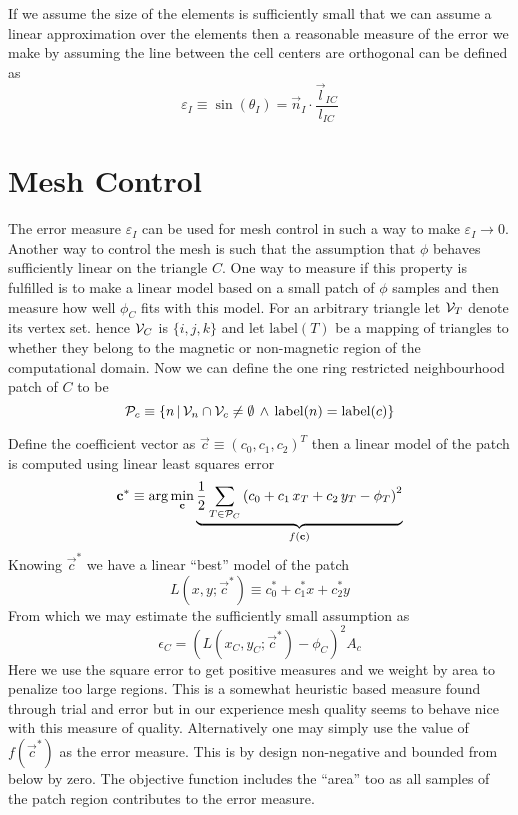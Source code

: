 \documentclass[preprint,nocopyrightspace]{sigplanconf}
\begin{document}
If we assume the size of the elements is sufficiently small that we
can assume a linear approximation over the elements then a reasonable
measure of the error we make by assuming the line between the cell
centers are orthogonal can be defined as
\begin{equation}
  \varepsilon_I 
  \equiv 
  \sin
  \left( 
    \theta_I 
  \right) 
  =
  \vec n_I 
  \cdot
  \frac{
    \vec l_{IC}
  }{
    l_{IC}
  }
\end{equation}

\section{Mesh Control}\label{sec:mesh-control}
The error measure $\varepsilon_I$ can be used for mesh control in such
a way to make $\varepsilon_I \rightarrow 0$. Another way to control
the mesh is such that the assumption that $\phi$ behaves sufficiently
linear on the triangle $C$. One way to measure if this property is
fulfilled is to make a linear model based on a small patch of $\phi$
samples and then measure how well $\phi_C$ fits with this model. For
an arbitrary triangle let $\mathcal{V}_T$ denote its vertex set. hence
$\mathcal{V}_C$ is $\{i, j, k\}$ and let $\text{label}\left(T\right)$ be a
mapping of triangles to whether they belong to the magnetic or
non-magnetic region of the computational domain. Now we can define the
one ring restricted neighbourhood patch of $C$ to be
\begin{equation}
  \mathcal{P}_c 
  \equiv
  \left\{  
    n 
    \, | \, 
    \mathcal{V}_n  \cap  \mathcal{V}_c  \neq \emptyset
    \,  \wedge  \, 
    \text{label}(n) = \text{label}(c)
  \right\}
\end{equation}

Define the coefficient vector as $\vec c \equiv ( c_0, c_1, c_2  )^T$
then a linear model of the patch is computed using linear least
squares error
\begin{equation}
  \mathbf{c} ^* 
  \equiv 
  \arg \min_{\mathbf{c} } 
\underbrace{
  \frac{1}{2}  
  \sum_{T \in \mathcal{P}_C}
  \left(       
c_0 + c_1 \, x_T + c_2 \, y_T
- \phi_T
  \right)^2
}_{f(\mathbf{c} )}
\end{equation}
Knowing $\vec c^*$ we have a linear ``best'' model of the patch
\begin{equation}
  L(x,y;\vec c^*) \equiv c_0^*  + c_1^* x + c_2^* y
\end{equation}
From which we may estimate the sufficiently small assumption as
\begin{equation}
  \epsilon_C  = \left( L(x_C,y_C;\vec c^*) - \phi_C \right)^2 A_c
\end{equation}
Here we use the square error to get positive measures and we weight by
area to penalize too large regions. This is a somewhat heuristic based
measure found through trial and error but in our experience mesh
quality seems to behave nice with this measure of
quality. Alternatively one may simply use the value of $f(\vec c^*)$
as the error measure. This is by design non-negative and bounded from
below by zero. The objective function includes the ``area'' too as all
samples of the patch region contributes to the error measure.
\end{document}
